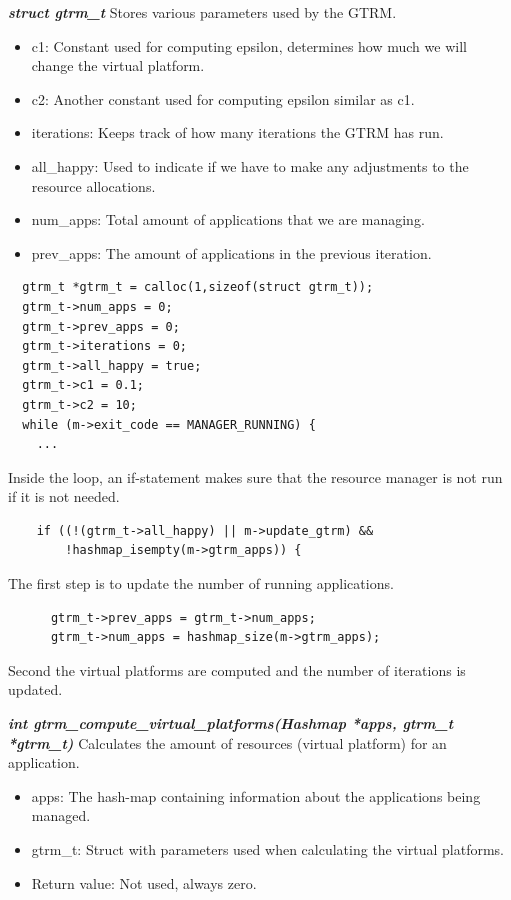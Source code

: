 \documentclass[nobiblatex]{LTHthesis}
\begin{document}
\begin{framed}
		\begin{flushleft}
		
				\textbf{\emph{{struct gtrm\_t}}} \newline
				Stores various parameters used by the GTRM.
				\begin{itemize}
				\item c1: Constant used for computing epsilon, determines how much we will change the virtual platform.
				\item c2: Another constant used for computing epsilon similar as c1.
				\item iterations: Keeps track of how many iterations the GTRM has run.
				\item all\_happy: Used to indicate if we have to make any adjustments to the resource allocations.
				\item num\_apps: Total amount of applications that we are managing.
				\item prev\_apps: The amount of applications in the previous iteration.
				\end{itemize}
		\end{flushleft}	
\end{framed}

\begin{verbatim}
  gtrm_t *gtrm_t = calloc(1,sizeof(struct gtrm_t));
  gtrm_t->num_apps = 0;
  gtrm_t->prev_apps = 0;
  gtrm_t->iterations = 0;
  gtrm_t->all_happy = true;
  gtrm_t->c1 = 0.1;
  gtrm_t->c2 = 10;
  while (m->exit_code == MANAGER_RUNNING) {
    ...
\end{verbatim}
Inside the loop, an if-statement makes sure that the resource manager is not run if it is not needed. 
\begin{verbatim}
    if ((!(gtrm_t->all_happy) || m->update_gtrm) && 
        !hashmap_isempty(m->gtrm_apps)) {
\end{verbatim}
The first step is to update the number of running applications.
\begin{verbatim}
      gtrm_t->prev_apps = gtrm_t->num_apps;
      gtrm_t->num_apps = hashmap_size(m->gtrm_apps);
\end{verbatim}
Second the virtual platforms are computed and the number of iterations is updated.
\begin{framed}
		\begin{flushleft}
				\textbf{\emph{{int gtrm\_compute\_virtual\_platforms(Hashmap *apps, gtrm\_t *gtrm\_t)}}} \newline
				Calculates the amount of resources (virtual platform) for an application.
				\begin{itemize}
				\item apps: The hash-map containing information about the applications being managed.
				\item gtrm\_t: Struct with parameters used when calculating the virtual platforms.
				\item Return value: Not used, always zero.
				\end{itemize}
		\end{flushleft}	
\end{framed}
\end{document}
